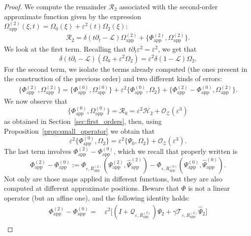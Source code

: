 \documentclass[11pt,reqno,a4paper]{amsart}
\def\eps{\varepsilon}
\newcommand{\cH}{\mathcal{H}}
\newcommand{\cL}{\mathcal{L}}
\newcommand{\cO}{\mathcal{O}}
\newcommand{\cQ}{\mathcal{Q}}
\newcommand{\cR}{\mathcal{R}}
\newcommand{\cT}{\mathcal{T}}
\newcommand{\cZ}{\mathcal{Z}}
\newcommand{\1}{\mathbbm{1}}
\theoremstyle{definition}
\theoremstyle{definition}
\numberwithin{equation}{section}
\newcommand{\Mapp}[2]{#1^{(#2)}_\mathrm{app}}
\begin{document}
\begin{proof}
    We compute the remainder $\cR_2$ associated with the second-order approximate function given by the expression $\Mapp{\Omega}{2}(\xi,t) = \Omega_0(\xi) + \eps^2(t)\Omega_2(\xi)$:
    \begin{align}
        \cR_2 = \delta(t \partial_t - \cL)\Mapp{\Omega}{2} + \{ \Mapp{\Phi}{2},\Mapp{\Omega}{2} \}.
    \end{align}
    We look at the first term. Recalling that $t\partial_t \eps^2 = \eps^2$, we get that 
    \begin{equation}
        \delta(t \partial_t - \cL)(\Omega_0 + \eps^2 \Omega_2)  = \eps^2\delta(1-\cL)\Omega_2.
    \end{equation}
    For the second term, we isolate the terms already computed (the ones present in the construction of the previous order) and two different kinds of errors:
    \begin{align}
        \{ \Mapp{\Phi}{2},\Mapp{\Omega}{2} \} = \{ \Mapp{\Phi}{0},\Mapp{\Omega}{0} \} + \eps^2\{ \Mapp{\Phi}{0},\Omega_2 \} + \{ \Mapp{\Phi}{2} - \Mapp{\Phi}{0},\Mapp{\Omega}{2} \}.
    \end{align}
    We now observe that
    \begin{equation}
        \{ \Mapp{\Phi}{0},\Mapp{\Omega}{0} \} = \cR_0 = \eps^2\cH_2 +  \cO_\cZ(\eps^3)
    \end{equation} 
    as obtained in Section~\ref{sec:first_orders}, then, using Proposition~\ref{prop:small_operator} we obtain that
    \begin{equation}
        \eps^2\{ \Mapp{\Phi}{0},\Omega_2 \} = \eps^2 \{ \Psi_0, \Omega_2 \} + \cO_\cZ(\eps^3).
    \end{equation}    
    The last term involves $\Mapp{\Phi}{2} - \Mapp{\Phi}{0}$, which we recall that properly written is
    \begin{equation}
        \Mapp{\Phi}{2} - \Mapp{\Phi}{0} := \Phi_{\eps,\Mapp{R}{2}}(\Mapp{\Psi}{2},\Mapp{\widehat{\Psi}}{2}) - \Phi_{\eps,\Mapp{R}{0}}(\Mapp{\Psi}{0},\Mapp{\widehat{\Psi}}{0}).
    \end{equation}
        Not only are those maps applied in different functions, but they are also computed at different approximate positions. Beware that $\Phi$ is not a linear operator (but an affine one), and the following identity holds:
    \begin{align}
        \Mapp{\Phi}{2} - \Mapp{\Phi}{0} = \,&\eps^2\Big[ ( I +\cQ_{\eps,\Mapp{R}{2}}) \Psi_2 + \gamma \cT_{\eps,\Mapp{R}{2}} \widehat{\Psi}_2\Big] \\

\end{align}
\end{proof}
\end{document}
